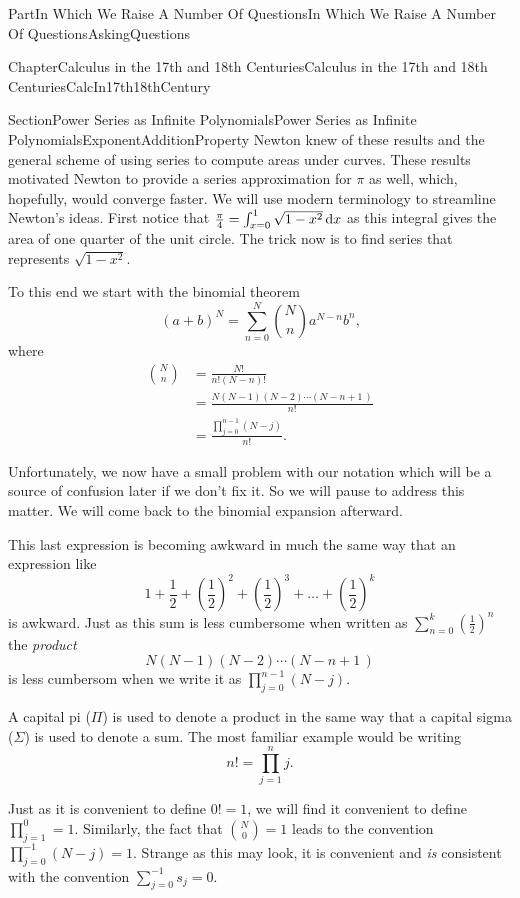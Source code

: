 \documentclass[oneside,10pt,]{book}
\numberwithin{equation}{part}
\newcommand{\dx}[1]{\,{\rm d}#1}
\newcommand{\amp}{&}
\begin{document}
\begin{partptx}{Part}{In Which We Raise A Number Of Questions}{}{In Which We Raise A Number Of Questions}{}{}{AskingQuestions}
\begin{chapterptx}{Chapter}{Calculus in the 17th and 18th Centuries}{}{Calculus in the 17th and 18th Centuries}{}{}{CalcIn17th18thCentury}
\begin{sectionptx}{Section}{Power Series as Infinite Polynomials}{}{Power Series as Infinite Polynomials}{}{}{ExponentAdditionProperty}
 Newton knew of these results and the general scheme of using series to compute areas under curves.  These results motivated Newton to provide a series approximation for \(\pi\) as well, which, hopefully, would converge faster. We will use modern terminology to streamline Newton's ideas. First notice that \(\frac{\pi}{4}=\int_{x=0}^1\sqrt{1-x^2}\dx{ x}\) as this integral gives the area of one quarter of the unit circle. The trick now is to find series that represents \(\sqrt{1-x^2}\).%
\par
To this end we start with the binomial theorem%
\begin{equation*}
\left(a+b\right)^N=\sum_{n=0}^N\binom{N}{n}a^{N-n}b^n\text{,}
\end{equation*}
where%
\begin{align*}
\binom{N}{n}\amp =\frac{N!}{n!\left(N-n\right)!}\\
\amp =\frac{N\left(N-1\right)\left(N-2\right)\cdots\left(N-n+1\,\right)}{n!}\\
\amp =\frac{\prod_{j=0}^{n-1}\left(N-j\right)}{n!}\text{.}
\end{align*}
%
\par
Unfortunately, we now have a small problem with our notation which will be a source of confusion later if we don't fix it.  So we will pause to address this matter.  We will come back to the binomial expansion afterward.%
\par
This last expression is becoming awkward in much the same way that an expression like%
\begin{equation*}
1+\frac{1}{2}+\left(\frac{1}{2}\right)^2+\left(\frac{1}{2}\right)^3+\ldots+\left(\frac{1}{2}\right)^k
\end{equation*}
is awkward.  Just as this sum is less cumbersome when written as \(\sum_{n=0}^k\left(\frac{1}{2}\right)^n\) the \emph{product}%
\begin{equation*}
N\left(N-1\right)\left(N-2\right)\cdots\left(N-n+1\,\right)
\end{equation*}
is less cumbersom when we write it as \(\prod_{j=0}^{n-1}\left(N-j\right)\).%
\par
A capital pi (\(\Pi\)) is used to denote a product in the same way that a capital sigma (\(\Sigma\)) is used to denote a sum.  The most familiar example would be writing%
\begin{equation*}
n!=\prod_{j=1}^{n}j\text{.}
\end{equation*}
%
\par
Just as it is convenient to define \(0!=1\), we will find it convenient to define \(\prod_{j=1}^{0}=1\). Similarly, the fact that \(\binom{N}{0}=1\) leads to the convention \(\prod_{j=0}^{-1}\left(N-j\right)=1\). Strange as this may look, it is convenient and \emph{is} consistent with the convention \(\sum_{j=0}^{-1}s_j=0\).%

\end{sectionptx}
\end{chapterptx}
\end{partptx}
\end{document}
